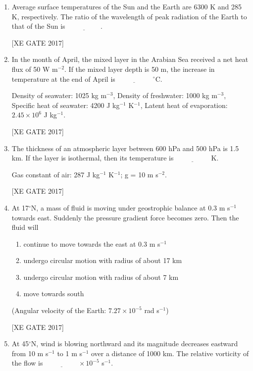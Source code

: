 \documentclass[journal,12pt,onecolumn]{IEEEtran}
\theoremstyle{remark}
\begin{document}
\begin{enumerate}
 \item Average surface temperatures of the Sun and the Earth are 6300 K and 285 K, respectively. The ratio of the wavelength of peak radiation of the Earth to that of the Sun is $\underline{\hspace{2cm}}$.
 
    \hfill [XE GATE 2017]

    \item In the month of April, the mixed layer in the Arabian Sea received a net heat flux of 50 W m$^{-2}$. If the mixed layer depth is 50 m, the increase in temperature at the end of April is $\underline{\hspace{2cm}}$ $^\circ$C.  

    Density of seawater: 1025 kg m$^{-3}$, Density of freshwater: 1000 kg m$^{-3}$, Specific heat of seawater: 4200 J kg$^{-1}$ K$^{-1}$, Latent heat of evaporation: $2.45 \times 10^6$ J kg$^{-1}$.  
    
    \hfill [XE GATE 2017]

    \item The thickness of an atmospheric layer between 600 hPa and 500 hPa is 1.5 km. If the layer is isothermal, then its temperature is $\underline{\hspace{2cm}}$ K.  

    Gas constant of air: 287 J kg$^{-1}$ K$^{-1}$; g = 10 m s$^{-2}$.  
    
    \hfill [XE GATE 2017]

    \item At 17$^\circ$N, a mass of fluid is moving under geostrophic balance at 0.3 m s$^{-1}$ towards east. Suddenly the pressure gradient force becomes zero. Then the fluid will  

    \begin{enumerate}
        \item continue to move towards the east at 0.3 m s$^{-1}$  
        \item undergo circular motion with radius of about 17 km  
        \item undergo circular motion with radius of about 7 km  
        \item move towards south  
    \end{enumerate}

    (Angular velocity of the Earth: $7.27 \times 10^{-5}$ rad s$^{-1}$)  
    
    \hfill [XE GATE 2017]

    \item At 45$^\circ$N, wind is blowing northward and its magnitude decreases eastward from 10 m s$^{-1}$ to 1 m s$^{-1}$ over a distance of 1000 km. The relative vorticity of the flow is $\underline{\hspace{2cm}} \times 10^{-5}$ s$^{-1}$.  


\end{enumerate}
\end{document}
